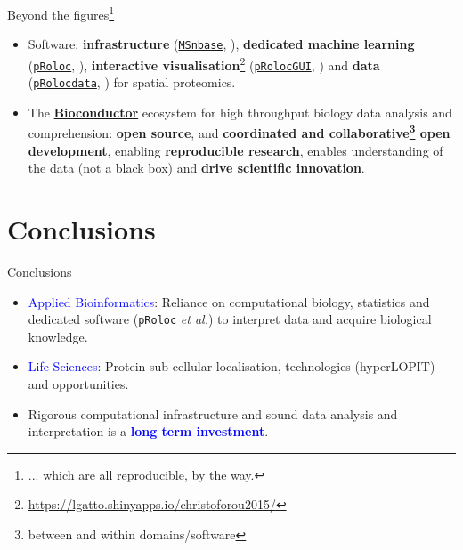\documentclass{beamer}
\theoremstyle{example}
\begin{document}
\begin{frame}{}

  Beyond the figures\footnote{... which are all reproducible, by the way.}

  \begin{itemize}
  \item Software: \textbf{infrastructure}
    (\href{http://bioconductor.org/packages/MSnbase}{\texttt{MSnbase}},
    \cite{Gatto:2012}), \textbf{dedicated machine learning}
    (\href{http://bioconductor.org/packages/pRoloc}{\texttt{pRoloc}},
    \cite{Gatto:2014a}), \textbf{interactive
      visualisation}\footnote{\url{https://lgatto.shinyapps.io/christoforou2015/}}
    (\href{http://bioconductor.org/packages/pRolocGUI}{\texttt{pRolocGUI}},
    \cite{pRolocGUI}) and \textbf{data}
    (\href{http://bioconductor.org/packages/pRolocdata}{\texttt{pRolocdata}},
    \cite{Gatto:2014a}) for spatial proteomics.
  \item The \href{http://bioconductor.org/}{\textbf{Bioconductor}}
    \citep{Huber:2015} ecosystem for high throughput biology data
    analysis and comprehension: \textbf{open source}, and
    \textbf{coordinated and collaborative\footnote{between and within
        domains/software} open development}, enabling
    \textbf{reproducible research}, enables understanding of the data
    (not a black box) and \textbf{drive scientific innovation}.
  \end{itemize}
\end{frame}



\section{Conclusions}


\begin{frame}[fragile]{Conclusions}
  \begin{itemize}
  \item \textcolor{Blue}{Applied Bioinformatics}: Reliance on
    computational biology, statistics and dedicated software
    (\texttt{pRoloc} \textit{et al.}) to interpret data and acquire
    biological knowledge.
  \item \textcolor{Blue}{Life Sciences}: Protein sub-cellular
    localisation, technologies (hyperLOPIT) and opportunities.
  \item Rigorous computational infrastructure and sound data analysis
    and interpretation is a \textcolor{Blue}{\textbf{long term
        investment}}.

  \end{itemize}

\end{frame}
\end{document}
